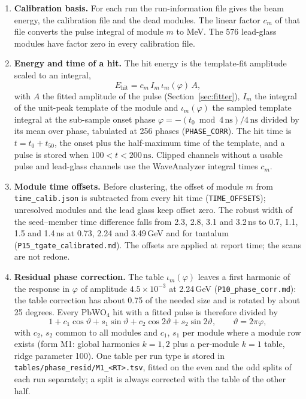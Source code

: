 \documentclass[11pt]{article}
\newcommand{\ns}{\,\mathrm{ns}}
\newcommand{\code}[1]{\texttt{#1}}
\begin{document}
\begin{enumerate}
\item \textbf{Calibration basis.} For each run the run-information file gives the beam energy, the calibration file and the dead modules. The linear factor $c_m$ of that file converts the pulse integral of module $m$ to MeV. The 576 lead-glass modules have factor zero in every calibration file.
\item \textbf{Energy and time of a hit.} The hit energy is the template-fit amplitude scaled to an integral,
\begin{equation}
E_{\mathrm{hit}} = c_m\, I_m\, \iota_m(\varphi)\, A ,
\label{eq:ehit}
\end{equation}
with $A$ the fitted amplitude of the pulse (Section~\ref{sec:fitter}), $I_m$ the integral of the unit-peak template of the module and $\iota_m(\varphi)$ the sampled template integral at the sub-sample onset phase $\varphi = -(t_0 \bmod 4\ns)/4\ns$ divided by its mean over phase, tabulated at 256 phases (\code{PHASE\_CORR}). The hit time is $t = t_0 + t_{50}$, the onset plus the half-maximum time of the template, and a pulse is stored when $100 < t < 200\ns$. Clipped channels without a usable pulse and lead-glass channels use the WaveAnalyzer integral times $c_m$.
\item \textbf{Module time offsets.} Before clustering, the offset of module $m$ from \code{time\_calib.json} is subtracted from every hit time (\code{TIME\_OFFSETS}); unresolved modules and the lead glass keep offset zero. The robust width of the seed--member time difference falls from 2.3, 2.8, 3.1 and 3.2\,ns to 0.7, 1.1, 1.5 and 1.4\,ns at 0.73, 2.24 and 3.49\,GeV and for tantalum (\code{P15\_tgate\_calibrated.md}). The offsets are applied at report time; the scans are not redone.
\item \textbf{Residual phase correction.} The table $\iota_m(\varphi)$ leaves a first harmonic of the response in $\varphi$ of amplitude $4.5 \times 10^{-3}$ at 2.24\,GeV (\code{P10\_phase\_corr.md}): the table correction has about 0.75 of the needed size and is rotated by about 25 degrees. Every PbWO$_4$ hit with a fitted pulse is therefore divided by
\begin{equation}
1 + c_1 \cos\vartheta + s_1 \sin\vartheta + c_2 \cos 2\vartheta + s_2 \sin 2\vartheta, \qquad \vartheta = 2\pi\varphi ,
\label{eq:phaseresid}
\end{equation}
with $c_2$, $s_2$ common to all modules and $c_1$, $s_1$ per module where a module row exists (form M1: global harmonics $k = 1, 2$ plus a per-module $k = 1$ table, ridge parameter 100). One table per run type is stored in \code{tables/phase\_resid/M1\_<RT>.tsv}, fitted on the even and the odd splits of each run separately; a split is always corrected with the table of the other half.

\end{enumerate}
\end{document}
